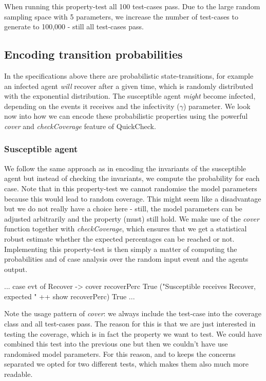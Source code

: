 When running this property-test all 100 test-cases pass. Due to the large random sampling space with 5 parameters, we increase the number of test-cases to generate to 100,000 - still all test-cases pass.

\subsection{Encoding transition probabilities}
In the specifications above there are probabilistic state-transitions, for example an infected agent \textit{will} recover after a given time, which is randomly distributed with the exponential distribution. The susceptible agent \textit{might} become infected, depending on the events it receives and the infectivity ($\gamma$) parameter. We look now into how we can encode these probabilistic properties using the powerful \textit{cover} and \textit{checkCoverage} feature of QuickCheck.

\subsubsection{Susceptible agent}
We follow the same approach as in encoding the invariants of the susceptible agent but instead of checking the invariants, we compute the probability for each case. Note that in this property-test we cannot randomise the model parameters because this would lead to random coverage. This might seem like a disadvantage but we do not really have a choice here - still, the model parameters can be adjusted arbitrarily and the property (must) still hold. %
We make use of the \textit{cover} function together with \textit{checkCoverage}, which ensures that we get a statistical robust estimate whether the expected percentages can be reached or not. Implementing this property-test is then simply a matter of computing the probabilities and of case analysis over the random input event and the agents output.

\begin{HaskellCode}
...
case evt of 
  Recover -> 
    cover recoverPerc True 
     ("Susceptible receives Recover, expected " ++ show recoverPerc) True
...
\end{HaskellCode}

Note the usage pattern of \textit{cover}: we always include the test-case into the coverage class and all test-cases pass. The reason for this is that we are just interested in testing the coverage, which is in fact the property we want to test. We could have combined this test into the previous one but then we couldn't have use randomised model parameters. For this reason, and to keeps the concerns separated we opted for two different tests, which makes them also much more readable.

